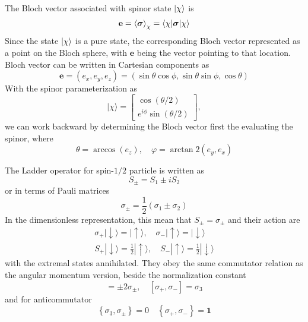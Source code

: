 \documentclass[../../../main.tex]{subfiles}
\begin{document}
The Bloch vector associated with spinor state $\ket{\chi}$ is
\begin{equation*}
    \mathbf{e }= \braket{\boldsymbol{\sigma}  }_{\chi}= \braket{\chi  | \boldsymbol{\sigma }|\chi}
\end{equation*}
Since the state $\ket{\chi}$ is a pure state, the corresponding Bloch vector represented as a point on the Bloch sphere, with $\mathbf{e}$ being the vector pointing to that location.
Bloch vector can be written in Cartesian components as
\begin{equation*}
    \mathbf{e} = (e_x,e_y,e_z) = (\sin \theta \cos \phi, \sin \theta \sin \phi, \cos \theta)
\end{equation*}
With the spinor parameterization as
\begin{equation*}
    |\chi\rangle = \begin{bmatrix}
        \cos(\theta/2) \\
        e^{i\phi} \sin(\theta/2)
    \end{bmatrix},
\end{equation*}
we can work backward by determining the Bloch vector first the evaluating the spinor, where
\begin{equation*}
    \theta = \arccos(e_z), \quad \varphi = \arctan2(e_y, e_x)
\end{equation*}

The Ladder operator for spin-$1/2$ particle is written as 
\begin{equation*}
    S_\pm = S_1 \pm iS_2
\end{equation*}
or in terms of Pauli matrices
\begin{equation*}
    \sigma_ \pm = \frac{1 }{2 }\left( \sigma_1 \pm \sigma_2 \right) 
\end{equation*}
In the dimensionless representation, this mean that $S_\pm=\sigma_\pm$ and their action are
\begin{gather*}
        \sigma_+ |\downarrow\rangle = |\uparrow\rangle, \quad \sigma_- |\uparrow\rangle = |\downarrow\rangle\\
    S_+ |\downarrow\rangle = \frac{1 }{2 } |\uparrow\rangle, \quad S_- |\uparrow\rangle = \frac{1 }{2} |\downarrow\rangle
\end{gather*}
with the extremal states annihilated.
They obey the same commutator relation as the angular momentum version, beside the normalization constant
\begin{equation*}
   [\sigma_3, \sigma_\pm] = \pm 2 \sigma_\pm, \quad [\sigma_+, \sigma_-] = \sigma_3 
\end{equation*}
and for anticommutator
\begin{equation*}
    \left\{ \sigma_3,\sigma_\pm  \right\} = 0 \quad
    \left\{\sigma_+,\sigma_-  \right\} =\mathbf{1 }
\end{equation*}
\end{document}
